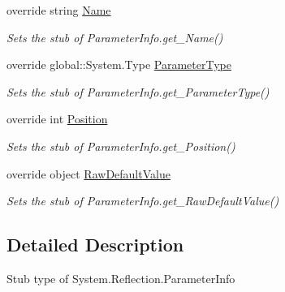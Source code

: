 \begin{DoxyCompactItemize}
override string \hyperlink{class_system_1_1_reflection_1_1_fakes_1_1_stub_parameter_info_a3844f326f3e60e9ee7851630417f0288}{Name}
\begin{DoxyCompactList}\small\item\em Sets the stub of Parameter\-Info.\-get\-\_\-\-Name()\end{DoxyCompactList}\item 
override global\-::\-System.\-Type \hyperlink{class_system_1_1_reflection_1_1_fakes_1_1_stub_parameter_info_aaeb1430f47a634e4d092e25d3e373da9}{Parameter\-Type}
\begin{DoxyCompactList}\small\item\em Sets the stub of Parameter\-Info.\-get\-\_\-\-Parameter\-Type()\end{DoxyCompactList}\item 
override int \hyperlink{class_system_1_1_reflection_1_1_fakes_1_1_stub_parameter_info_a840c765491161f7f4b01bfe928a136dc}{Position}
\begin{DoxyCompactList}\small\item\em Sets the stub of Parameter\-Info.\-get\-\_\-\-Position()\end{DoxyCompactList}\item 
override object \hyperlink{class_system_1_1_reflection_1_1_fakes_1_1_stub_parameter_info_af33f4ecb4dcf145313826377135639bf}{Raw\-Default\-Value}
\begin{DoxyCompactList}\small\item\em Sets the stub of Parameter\-Info.\-get\-\_\-\-Raw\-Default\-Value()\end{DoxyCompactList}\end{DoxyCompactItemize}


\subsection{Detailed Description}
Stub type of System.\-Reflection.\-Parameter\-Info



